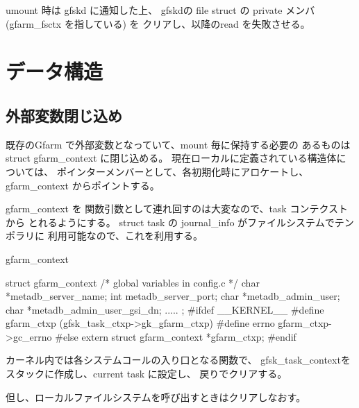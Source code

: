 	umount 時は gfskd に通知した上、
	gfskdの file struct の private メンバ(gfarm_fsctx を指している) を
	クリアし、以降のread を失敗させる。

\section{データ構造}

\subsection{ 外部変数閉じ込め }

	既存のGfarm で外部変数となっていて、mount 毎に保持する必要の
	あるものは struct gfarm_context に閉じ込める。
	現在ローカルに定義されている構造体については、
	ポインターメンバーとして、各初期化時にアロケートし、
	gfarm_context からポイントする。


	gfarm_context を
	関数引数として連れ回すのは大変なので、task コンテクストから
	とれるようにする。
	struct task の journal_info がファイルシステムでテンポラリに
	利用可能なので、これを利用する。

	\begin{itembox}[l]{gfarm_context}\begin{cprog}
        struct gfarm_context {
                /* global variables in config.c */
                char *metadb_server_name;
                int metadb_server_port;
                char *metadb_admin_user;
                char *metadb_admin_user_gsi_dn;
		.....
        };
        #ifdef __KERNEL__
        #define gfarm_ctxp (gfsk_task_ctxp->gk_gfarm_ctxp)
        #define errno        gfarm_ctxp->gc_errno
        #else
        extern struct gfarm_context  *gfarm_ctxp;
        #endif
	\end{cprog}\end{itembox}

	カーネル内では各システムコールの入り口となる関数で、
	gfsk_task_contextをスタックに作成し、current task に設定し、
	戻りでクリアする。

	但し、ローカルファイルシステムを呼び出すときはクリアしなおす。


